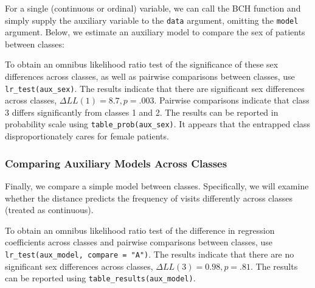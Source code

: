 \documentclass[
  man,floatsintext]{apa6}
\newenvironment{Shaded}{\begin{snugshade}}{\end{snugshade}}
\newcommand{\AttributeTok}[1]{\textcolor[rgb]{0.77,0.63,0.00}{#1}}
\newcommand{\FunctionTok}[1]{\textcolor[rgb]{0.00,0.00,0.00}{#1}}
\newcommand{\NormalTok}[1]{#1}
\newcommand{\OtherTok}[1]{\textcolor[rgb]{0.56,0.35,0.01}{#1}}
\newcommand{\SpecialCharTok}[1]{\textcolor[rgb]{0.00,0.00,0.00}{#1}}
\newcommand{\StringTok}[1]{\textcolor[rgb]{0.31,0.60,0.02}{#1}}
\begin{document}
For a single (continuous or ordinal) variable,
we can call the BCH function and simply supply the auxiliary variable to the \texttt{data} argument, omitting the \texttt{model} argument.
Below, we estimate an auxiliary model to compare the sex of patients between classes:

\begin{Shaded}
\end{Shaded}

To obtain an omnibus likelihood ratio test of the significance of these sex differences across classes,
as well as pairwise comparisons between classes,
use \texttt{lr\_test(aux\_sex)}.
The results indicate that there are significant sex differences across classes, \(\Delta LL(1) = 8.7, p = .003\).
Pairwise comparisons indicate that class 3 differs significantly from classes 1 and 2.
The results can be reported in probability scale using \texttt{table\_prob(aux\_sex)}.
It appears that the entrapped class disproportionately cares for female patients.

\hypertarget{comparing-auxiliary-models-across-classes}{%
\subsubsection{Comparing Auxiliary Models Across Classes}\label{comparing-auxiliary-models-across-classes}}

Finally, we compare a simple model between classes.
Specifically, we will examine whether the distance predicts the frequency of visits differently across classes (treated as continuous).

\begin{Shaded}
\end{Shaded}

To obtain an omnibus likelihood ratio test of the difference in regression coefficients across classes
and pairwise comparisons between classes,
use \texttt{lr\_test(aux\_model,\ compare\ =\ "A")}.
The results indicate that there are no significant sex differences across classes, \(\Delta LL(3) = 0.98, p = .81\).
The results can be reported using \texttt{table\_results(aux\_model)}.
\end{document}
